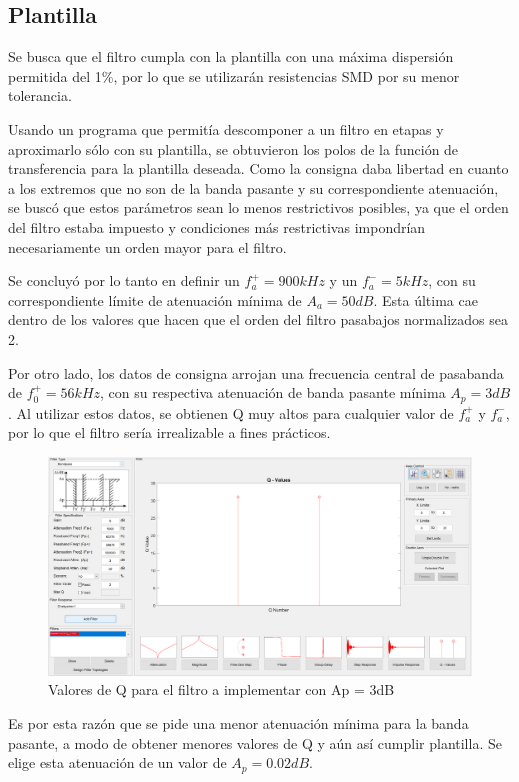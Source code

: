 \documentclass[../../tc_tp5_main.tex]{subfiles}
\begin{document}
	\subsection{Plantilla}
	Se busca que el filtro cumpla con la plantilla con una máxima dispersión permitida del 1\%, por lo que se utilizarán resistencias SMD por su menor tolerancia. \par
	Usando un programa que permitía descomponer a un filtro en etapas y aproximarlo sólo con su plantilla, se obtuvieron los polos de la función de transferencia para la plantilla deseada. Como la consigna daba libertad en cuanto a los extremos que no son de la banda pasante y su correspondiente atenuación, se buscó que estos parámetros sean lo menos restrictivos posibles, ya que el orden del filtro estaba impuesto y condiciones más restrictivas impondrían necesariamente un orden mayor para el filtro.\par
	Se concluyó por lo tanto en definir un $f_a^+ = 900kHz$ y un $f_a^- = 5kHz$, con su correspondiente límite de atenuación mínima de $A_a = 50 dB$. Esta última cae dentro de los valores que hacen que el orden del filtro pasabajos normalizados sea 2.\par 
	Por otro lado, los datos de consigna arrojan una frecuencia central de pasabanda de $f_0^+ = 56kHz$, con su respectiva atenuación de banda pasante mínima $A_p  = 3 dB$. Al utilizar  estos datos, se obtienen Q muy altos para cualquier valor de $f_a^+$ y $f_a^-$, por lo que el filtro sería irrealizable a fines prácticos.\par
	 \begin{figure}[H]	%
	\centering
	\includegraphics[scale=0.5]{imagenes/q_fallidos.png}
	\caption{Valores de Q para el filtro a implementar con Ap = 3dB}
	\label{fig:ej2_q_fallidos}
	\end{figure}
	Es por esta razón que se pide una menor atenuación mínima para la banda pasante, a modo de obtener menores valores de Q y aún así cumplir plantilla. Se elige esta atenuación de un valor de  $A_p  = 0.02 dB$.\par
	
\end{document}
